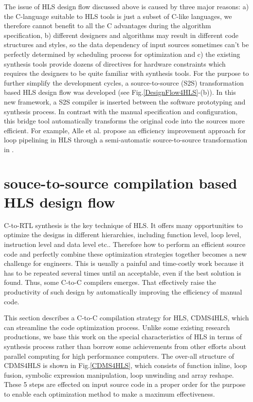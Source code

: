 \documentclass[10pt,twocolumn,letterpaper]{article}
\begin{document}
The issue of HLS design flow discussed above is caused by three major reasons: a) the C-language suitable to HLS tools is just a subset of C-like languages, we therefore cannot benefit to all the C advantages during the algorithm specification, b) different designers and algorithms may result in different code structures and styles, so the data dependency of input sources sometimes can't be perfectly determined by scheduling process for optimization and c) the existing synthesis tools provide dozens of directives for hardware constraints which requires the designers to be quite familiar with synthesis tools. For the purpose to further simplify the development cycles, a source-to-source (S2S) transformation based HLS design flow was developed (see Fig.\ref{DesignFlow4HLS}-(b)). In this new framework, a S2S compiler is inserted between the software prototyping and synthesis process. In contrast with the manual specification and configuration, this bridge tool automatically transforms the original code into the sources more efficient. For example, Alle et al. propose an efficiency improvement approach for loop pipelining in HLS through a semi-automatic source-to-source transformation in \cite{57}.

\section{souce-to-source compilation based HLS design flow}
\label{sect:Souce-to-Source compilation based HLS design flow}
C-to-RTL synthesis is the key technique of HLS. It offers many opportunities to optimize the designs in different hierarchies, including function level, loop level, instruction level and data level etc.. Therefore how to perform an efficient source code and perfectly combine these optimization strategies together becomes a new challenge for engineers. This is usually a painful and time-costly work because it has to be repeated several times until an acceptable, even if the best solution is found. Thus, some C-to-C compilers emerges. That effectively raise the productivity of such design by automatically improving the efficiency of manual code.

This section describes a C-to-C compilation strategy for HLS, CDMS4HLS, which can streamline the code optimization process. Unlike some existing research productions, we base this work on the special characteristics of HLS in terms of synthesis process rather than borrow some achievements from other efforts about parallel computing for high performance computers. The over-all structure of CDMS4HLS is shown in Fig.\ref{CDMS4HLS}, which consists of function inline, loop fusion, symbolic expression manipulation, loop unwinding and array reshape. These 5 steps are effected on input source code in a proper order for the purpose to enable each optimization method to make a maximum effectiveness.
\end{document}
